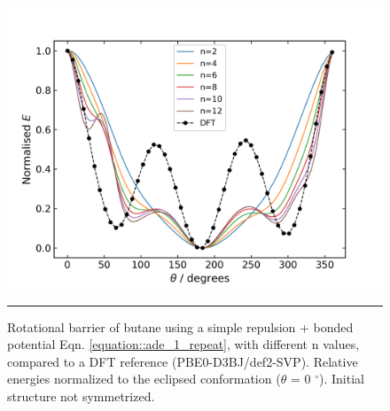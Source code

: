 \documentclass[../../main.tex]{subfiles}
\begin{document}
\begin{figure}[h!]
	\vspace{0.4cm}
	\centering
	\includegraphics[width=12cm]{5/autode/figs/figS4}
	\vspace{0.4cm}
	\hrule
	\caption{Rotational barrier of butane using a simple repulsion + bonded potential Eqn. \ref{equation::ade_1_repeat}, with different n values, compared to a DFT reference (PBE0-D3BJ/def2-SVP). Relative energies normalized to the eclipsed conformation ($\theta$ = 0 $^{\circ}$). Initial structure not symmetrized.}
	\label{fig::ade_si_4}
\end{figure}
\end{document}
